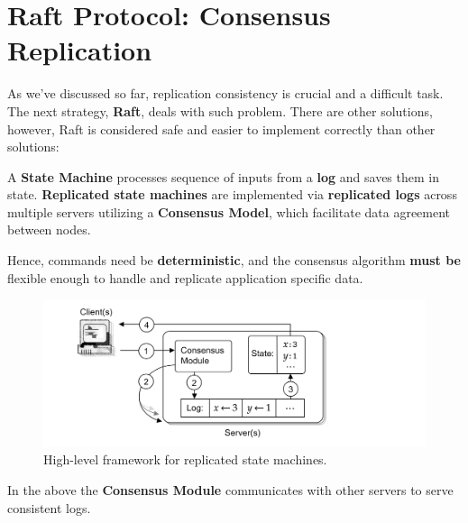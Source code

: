 \section{Raft Protocol: Consensus Replication}

\label{sec:raft}
\noindent
As we've discussed so far, replication consistency is crucial and a 
difficult task. The next strategy, \textbf{Raft}, deals with such problem.
There are other solutions, however, Raft is considered safe and easier to 
implement correctly than other solutions:
\begin{Def}
    
    A \textbf{State Machine} processes sequence of inputs from a \textbf{log} and saves them
    in state.
    \textbf{Replicated state machines} are implemented via \textbf{replicated logs} across multiple servers
    utilizing a \textbf{Consensus Model}, which facilitate data agreement between nodes. 
    
    Hence, commands need be \textbf{deterministic}, and the consensus algorithm 
    \textbf{must be} flexible enough to handle and replicate application specific data.
\end{Def}

\vspace{-1.5em}
\begin{figure}[h]
    \centering
    \includegraphics[width=1\textwidth]{Sections/raft/state.png}
    \caption{High-level framework for replicated state machines.}
\end{figure}

\noindent
In the above the \textbf{Consensus Module} communicates with other servers to serve consistent logs. 

\newpage 
